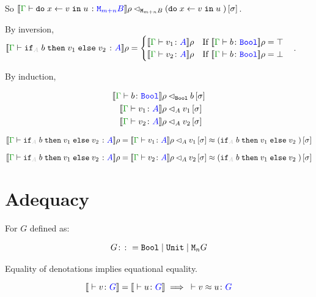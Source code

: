 \documentclass{Report}
\newcommand{\relates}[0]{\lhd}
\newcommand{\logRel}[3]{#1 \relates_{#2} #3}
\newcommand{\zberelation}[3]{\berelation{}{#1}{#2}{#3}}
\newcommand\ztyperelation[2]{\typerelation{}{#1}{#2}}
\begin{document}
So $\logRel{\deno{\gtyperelation{\doin{x}{v}{u}}{\M{m+n}{B}}}\rho}{\M{m+n}{B}}{(\doin{x}{v}{u})\ssi}$.



By inversion, $\deno{\gtyperelation{\pifthenelse{A}{b}{v_1}{v_2}}{A}}\rho = \begin{cases}
    \deno{\gtyperelation{v_1}{A}}\rho \qt{If }\deno{\gtyperelation{b}{\B}}\rho = \top\\
    \deno{\gtyperelation{v_2}{A}}\rho \qt{If }\deno{\gtyperelation{b}{\B}}\rho = \bot
\end{cases}
$.

By induction,

\begin{align}
    \logRel{\deno{\gtyperelation{b}{\B}&}\rho}{\B}{b\ssi}\\
    \logRel{\deno{\gtyperelation{v_1}{A}&}\rho}{A}{v_1\ssi}\\
    \logRel{\deno{\gtyperelation{v_2}{A}&}\rho}{A}{v_2\ssi}
\end{align}

    \begin{equation}
        \logRel{\deno{\gtyperelation{\pifthenelse{A}{b}{v_1}{v_2}}{A}}\rho = \deno{\gtyperelation{v_1}{A}}\rho}{A}{v_1\ssi\beequiv (\pifthenelse{A}{b}{v_1}{v_2})\ssi}
    \end{equation}

\begin{equation}
    \logRel{\deno{\gtyperelation{\pifthenelse{A}{b}{v_1}{v_2}}{A}}\rho = \deno{\gtyperelation{v_2}{A}}\rho}{A}{v_2\ssi\beequiv (\pifthenelse{A}{b}{v_1}{v_2})\ssi}
\end{equation}

\section{Adequacy}
\begin{theorem}[Adequacy]
For $G$ defined as:

\begin{align}
    G\colon\colon= \texttt{Bool} \mid \texttt{Unit} \mid \texttt{M}_{n}{G}
\end{align}

Equality of denotations implies equational equality.

\begin{equation}
    \deno{\ztyperelation{v}{G}} = \deno{\ztyperelation{u}{G}} \implies \zberelation{v}{u}{G}
\end{equation}

\end{theorem}
\end{document}
